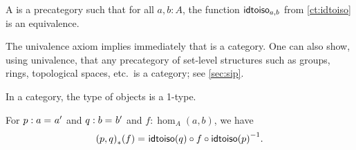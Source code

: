 \documentclass[hott-all.tex]{subfiles}
\begin{document}

\begin{defn}
  A 
  is a precategory such that for all $a,b:A$, the function $\mathsf{idtoiso}_{a,b}$ from \cref{ct:idtoiso} is an equivalence.
\end{defn}


\begin{eg}
  The univalence axiom implies immediately that \uset is a category.
  One can also show, using univalence, that any precategory of set-level structures such as groups, rings, topological spaces, etc.\ is a category; see \cref{sec:sip}.
\end{eg}


\begin{lem}
  In a category, the type of objects is a 1-type.
\end{lem}


\begin{lem}
  For $p:a =_{} a'$ and $q:b =_{} b'$ and $f:\hom_A(a,b)$, we have
  \begin{equation}\fakelabel{ct:idtoisocompute}
    \id{\trans{(p,q)}{f}}
    {\idtoiso(q)\circ f \circ \inv{\idtoiso(p)}}.
  \end{equation}
\end{lem}
\end{document}

